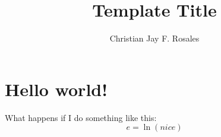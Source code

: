\documentclass{article}
\title{Template Title}
\author{Christian Jay F. Rosales}
\date{}
\begin{document}
\maketitle

\section{Hello world!}

What happens if I do something like this:$$
e = \ln(nice)
$$
\end{document}
